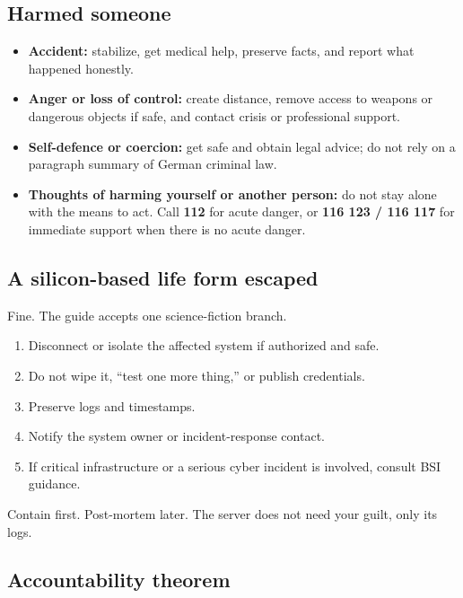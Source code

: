 \hypertarget{harmed-someone}{%
\subsection{Harmed someone}\label{harmed-someone}}

\begin{itemize}
\tightlist
\item
  \textbf{Accident:} stabilize, get medical help, preserve facts, and
  report what happened honestly.
\item
  \textbf{Anger or loss of control:} create distance, remove access to
  weapons or dangerous objects if safe, and contact crisis or
  professional support.
\item
  \textbf{Self-defence or coercion:} get safe and obtain legal advice;
  do not rely on a paragraph summary of German criminal law.
\item
  \textbf{Thoughts of harming yourself or another person:} do not stay
  alone with the means to act. Call \textbf{112} for acute danger, or
  \textbf{116 123 / 116 117} for immediate support when there is no
  acute danger.
\end{itemize}

\hypertarget{a-silicon-based-life-form-escaped}{%
\subsection{A silicon-based life form
escaped}\label{a-silicon-based-life-form-escaped}}

Fine. The guide accepts one science-fiction branch.

\begin{enumerate}
\def\labelenumi{\arabic{enumi}.}
\tightlist
\item
  Disconnect or isolate the affected system if authorized and safe.
\item
  Do not wipe it, ``test one more thing,'' or publish credentials.
\item
  Preserve logs and timestamps.
\item
  Notify the system owner or incident-response contact.
\item
  If critical infrastructure or a serious cyber incident is involved,
  consult BSI guidance.
\end{enumerate}

Contain first. Post-mortem later. The server does not need your guilt,
only its logs.

\hypertarget{accountability-theorem}{%
\subsection{Accountability theorem}\label{accountability-theorem}}

